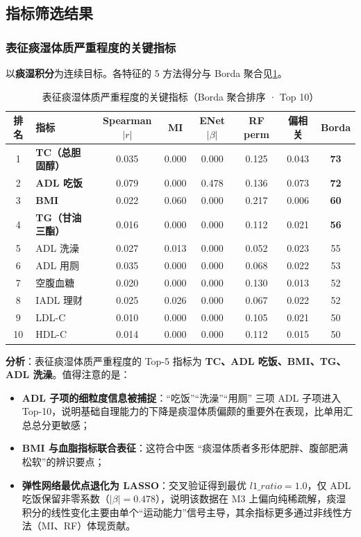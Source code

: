 \documentclass{MathorCupmodeling}
\providecommand{\tightlist}{%
  \setlength{\itemsep}{0pt}\setlength{\parskip}{0pt}}
\begin{document}
\subsection{指标筛选结果}

\subsubsection{表征痰湿体质严重程度的关键指标}

以\textbf{痰湿积分}为连续目标。各特征的 5 方法得分与 Borda 聚合见\cref{tab:q1-phlegm}。

\begin{table}[H]
\centering\small
\caption{表征痰湿体质严重程度的关键指标（Borda 聚合排序 · Top 10）}\label{tab:q1-phlegm}
\begin{tabular}{@{}c l c c c c c c@{}}
\toprule
排名 & 指标 & Spearman$|r|$ & MI & ENet$|\beta|$ & RF perm & 偏相关 & \textbf{Borda} \\
\midrule
1  & \textbf{TC（总胆固醇）} & 0.035 & 0.000 & 0.000 & 0.125 & 0.043 & \textbf{73} \\
2  & \textbf{ADL 吃饭}     & 0.079 & 0.000 & 0.478 & 0.136 & 0.073 & \textbf{72} \\
3  & \textbf{BMI}          & 0.022 & 0.060 & 0.000 & 0.217 & 0.006 & \textbf{60} \\
4  & \textbf{TG（甘油三酯）} & 0.016 & 0.000 & 0.000 & 0.112 & 0.021 & \textbf{56} \\
5  & ADL 洗澡              & 0.027 & 0.013 & 0.000 & 0.052 & 0.023 & 55 \\
6  & ADL 用厕              & 0.035 & 0.000 & 0.000 & 0.068 & 0.022 & 53 \\
7  & 空腹血糖              & 0.020 & 0.000 & 0.000 & 0.130 & 0.013 & 52 \\
8  & IADL 理财             & 0.025 & 0.026 & 0.000 & 0.067 & 0.022 & 52 \\
9  & LDL-C                 & 0.010 & 0.000 & 0.000 & 0.105 & 0.021 & 50 \\
10 & HDL-C                 & 0.014 & 0.000 & 0.000 & 0.112 & 0.015 & 50 \\
\bottomrule
\end{tabular}
\end{table}

\textbf{分析}：表征痰湿体质严重程度的 Top-5 指标为 \textbf{TC、ADL 吃饭、BMI、TG、ADL 洗澡}。值得注意的是：

\begin{itemize}
\tightlist
\item \textbf{ADL 子项的细粒度信息被捕捉}：``吃饭''``洗澡''``用厕'' 三项 ADL 子项进入 Top-10，说明基础自理能力的下降是痰湿体质偏颇的重要外在表现，比单用汇总总分更敏感；
\item \textbf{BMI 与血脂指标联合表征}：这符合中医 ``痰湿体质者多形体肥胖、腹部肥满松软''的辨识要点；
\item \textbf{弹性网络最优点退化为 LASSO}：交叉验证得到最优 $l1\_ratio=1.0$，仅 ADL 吃饭保留非零系数（$|\beta|=0.478$），说明该数据在 M3 上偏向纯稀疏解，痰湿积分的线性变化主要由单个``运动能力''信号主导，其余指标更多通过非线性方法（MI、RF）体现贡献。
\end{itemize}
\end{document}
